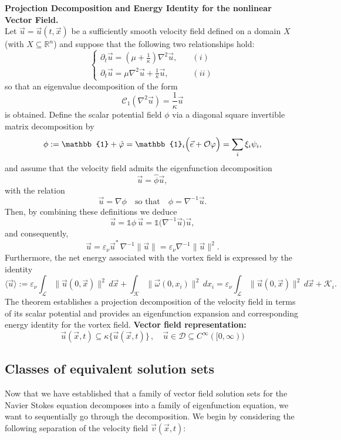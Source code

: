 \documentclass[12pt]{article}
\begin{document}
\begin{theorem} \textbf{Projection Decomposition and Energy Identity for the nonlinear Vector Field.}  \\ 
Let \(\vec{u} = \vec{u}(t,\vec{x})\) be a sufficiently smooth velocity field defined on a domain \(X\) (with \(X \subseteq \mathbb{R}^n\)) and suppose that the following two relationships hold:
\[
\begin{cases}
\partial_{t} \vec{u} = \left(\mu + \frac{1}{\kappa}\right) \nabla^{2} \vec{u}, \quad & (i) \\[1mm]
\partial_{t} \vec{u} = \mu \nabla^{2} \vec{u} + \frac{1}{\kappa} \vec{u}, \quad & (ii)
\end{cases}
\]
so that an eigenvalue decomposition of the form
\[
\mathcal{C}_{1} \left(\nabla^{2} \vec{u}\right) = \frac{1}{\kappa} \vec{u}
\]
is obtained. Define the scalar potential field \(\phi\) via a diagonal square invertible matrix decomposition by
\[
\phi := \mathbb{1} + \hat{\varphi} = \mathbb{1}_{i}\Bigl(\vec{e} + \mathcal{O}\varphi\Bigr) = \sum_{i} \xi_{i} \psi_{i},
\]
and assume that the velocity field admits the eigenfunction decomposition
\[
\vec{u} = \hat{\phi} \vec{u},
\]
with the relation
\[
\vec{u} = \nabla \phi \quad \text{so that} \quad \phi = \nabla^{-1} \vec{u}.
\]
Then, by combining these definitions we deduce
\[
\vec{u} = \mathbb{1}\phi\,\vec{u} = \mathbb{1}\bigl(\nabla^{-1}\vec{u}\bigr)\vec{u},
\]
and consequently,
\[
\vec{u} = \varepsilon_{\nu} \vec{u}^{*}\,\nabla^{-1}\|\vec{u}\| = \varepsilon_{\nu}\nabla^{-1}\|\vec{u}\|^{2}.
\]
Furthermore, the net energy associated with the vortex field is expressed by the identity
\[
\langle \vec{u} \rangle := \varepsilon_{\nu} \int_{\mathcal{L}} \|\vec{u}(0,\vec{x})\|^{2}\,d\vec{x} + \int_{\mathcal{K}} \|\vec{\omega}(0,x_{i})\|^{2}\,dx_{i}
= \varepsilon_{\nu} \int_{\mathcal{L}} \|\vec{u}(0,\vec{x})\|^{2}\,d\vec{x} + \mathcal{K}_{i}.
\]
The theorem establishes a projection decomposition of the velocity field in terms of its scalar potential and provides an eigenfunction expansion and corresponding energy identity for the vortex field. 
\textbf{Vector field representation:}
\[
\vec{u}(\vec{x}, t) \subseteq \kappa \{\vec{u}(\vec{x}, t)\} \, , \quad \vec{u} \in \mathcal{D} \subseteq C^\infty([0, \infty))
\]
\end{theorem}

\subsection{Classes of equivalent solution sets}
Now that we have established that a family of vector field solution sets for the Navier Stokes equation decomposes into a family of eigenfunction equation, we want to sequentially go through the decomposition. We begin by considering the following separation of the velocity field \(\vec{v}(\vec{x}, t)\): \\ 
\end{document}
